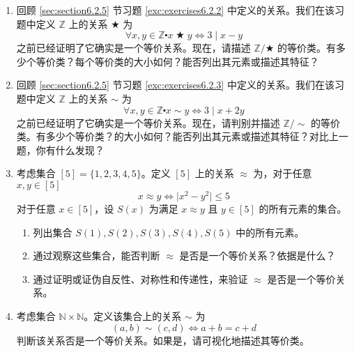 \begin{enumerate}[label=(\arabic*)]
    \item 回顾 \ref{sec:section6.2.5} 节习题 \ref{exc:exercises6.2.2} 中定义的关系。我们在该习题中定义 $\mathbb{Z}$ 上的关系 $\bigstar$ 为
    \[\forall x, y \in \mathbb{Z} \centerdot x \;\bigstar\; y \iff 3 \mid x - y\]
    之前已经证明了它确实是一个等价关系。现在，请描述 $\mathbb{Z}/\bigstar$ 的等价类。有多少个等价类？每个等价类的大小如何？能否列出其元素或描述其特征？
    \item 回顾 \ref{sec:section6.2.5} 节习题 \ref{exc:exercises6.2.3} 中定义的关系。我们在该习题中定义 $\mathbb{Z}$ 上的关系 $\sim$ 为
    \[\forall x, y \in \mathbb{Z} \centerdot x \sim y \iff 3 \mid x + 2y\]
    之前已经证明了它确实是一个等价关系。现在，请判别并描述 $\mathbb{Z}/\sim$ 的等价类。有多少个等价类？的大小如何？能否列出其元素或描述其特征？对比上一题，你有什么发现？
    \item 考虑集合 $[5]=\{1,2,3,4,5\}$。定义 $[5]$ 上的关系 $\approx$ 为，对于任意 $x,y \in [5]$
    \[x \approx y \iff \vert x^2 - y^2 \vert \le 5\]
    对于任意 $x \in [5]$，设 $S(x)$ 为满足 $x \approx y$ 且 $y \in [5]$ 的所有元素的集合。
    \begin{enumerate}[label=(\alph*)]
        \item 列出集合 $S(1), S(2), S(3), S(4), S(5)$ 中的所有元素。
        \item 通过观察这些集合，能否判断 $\approx$ 是否是一个等价关系？依据是什么？
        \item 通过证明或证伪自反性、对称性和传递性，来验证 $\approx$ 是否是一个等价关系。
    \end{enumerate}
    \item 考虑集合 $\mathbb{N} \times \mathbb{N}$。定义该集合上的关系 $\sim$ 为
    \[(a, b) \sim (c, d) \iff a + b = c + d\]
    判断该关系否是一个等价关系。如果是，请可视化地描述其等价类。
\end{enumerate}
